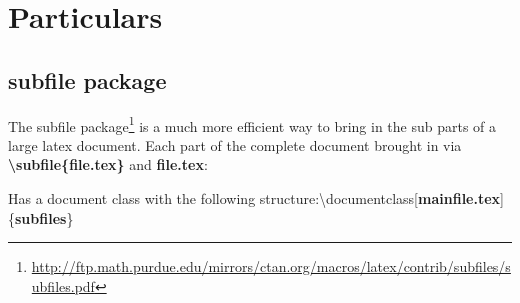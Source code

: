 \documentclass[main.tex]{subfiles}
\begin{document}
\chapter{Particulars}\label{ch:howitworks}

\section{subfile package}
The subfile package\footnote{\url{http://ftp.math.purdue.edu/mirrors/ctan.org/macros/latex/contrib/subfiles/subfiles.pdf}} is a much more efficient way to bring in the sub parts of a large latex document.
Each part of the complete document brought in via \textbf{\textbackslash subfile\{file.tex\}} and \textbf{file.tex}:

\noindent Has a document class with the following structure:\newline\indent\textbackslash documentclass[\textbf{mainfile.tex}]\{\textbf{subfiles}\}






\end{document}
